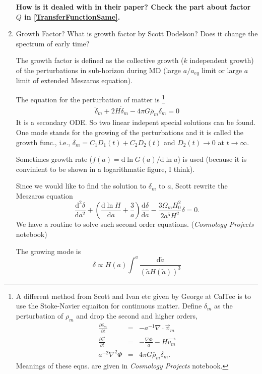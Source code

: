 \begin{enumerate}
{\bf\color{red} How is it dealed with in their paper? Check the part about factor $Q$ in \ref{TransferFunctionSame}.}

\item
Growth Factor? What is growth factor by Scott Dodelson? Does it change the spectrum of early time?

The growth factor is defined as the collective growth ($k$ independent growth) of the perturbations in sub-horizon during MD (large $a/a_{eq}$ limit or large $a$ limit of extended Meszaros equation).

The equation for the perturbation of matter is 
{\footnote{
A different method from Scott and Ivan etc given by George at CalTec is to use the Stoke-Navier equaiton for continuous matter. Define $\delta_m$ as the perturbation of $\rho_m$ and drop the second and higher orders,
\begin{eqnarray}
\frac{\partial \delta_m}{\partial t}&=&-a^{-1}\nabla\cdot \vec v_m \\
\frac{\partial\vec v}{\partial t}&=&-\frac{\nabla \Phi}{a}-H\vec{ v_m} \\
a^{-2}\nabla^2\Phi&=&4\pi G \bar\rho_m\delta_m    .
\end{eqnarray}
Meanings of these eqns. are given in {\it Cosmology Projects} notebook.
}}
\begin{eqnarray}
\ddot \delta_m + 2H\dot \delta_m - 4\pi G \bar \rho_m \delta_m=0
\end{eqnarray}
It is a secondary ODE. So two linear indepent special solutions can be found. One mode stands for the growing of the perturbations and it is called the growth func., i.e., $\delta_m=C_1D_1(t)+C_2 D_2(t)$ and $D_2(t)\rightarrow 0$ at $t\rightarrow \infty$.

Sometimes growth rate ($f(a)=\mathrm d \ln{G(a)}/\mathrm d\ln a$) is used (because it is convinient to be shown in a logarithmatic figure, I think).

Since we would like to find the solution to $\delta_m$ to $a$, Scott rewrite the Meszaros equation
\begin{equation}
\frac{\mathrm d^2\delta}{\mathrm d a^2}+(\frac{\mathrm d \ln H}{\mathrm d a}+\frac{3}{a})\frac{\mathrm d \delta}{\mathrm d a}-\frac{3\Omega_m H_0^2}{2a^5 H^2}\delta=0    .
\end{equation}
We have a routine to solve such second order equations. ({\it Cosmology Projects} notebook)

The growing mode is
\begin{equation}
\delta\propto H(a)\int^a \frac{\mathrm d \tilde{a}}{(\tilde a H(\tilde a))^3}
\end{equation}


\end{enumerate}
